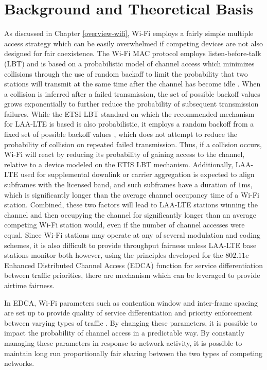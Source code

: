 \section{Background and Theoretical Basis}
\label{background}
As discussed in Chapter \ref{overview-wifi}, \mbox{Wi-Fi} employs a fairly simple multiple access strategy which can be easily overwhelmed if competing devices are not also designed for fair coexistence. The \mbox{Wi-Fi} MAC protocol employs listen-before-talk (LBT) and is based on a probabilistic model of channel access which minimizes collisions through the use of random backoff to limit the probability that two stations will transmit at the same time after the channel has become idle \cite{80211}.  When a collision is inferred after a failed transmission, the set of possible backoff values grows exponentially to further reduce the probability of subsequent transmission failures.  While the ETSI LBT standard on which the recommended mechanism for \mbox{LAA-LTE} is based is also probabilistic, it employs a random backoff from a fixed set of possible backoff values \cite{3gpp}, which does not attempt to reduce the probability of collision on repeated failed transmission.  Thus, if a collision occurs, \mbox{Wi-Fi} will react by reducing its probability of gaining access to the channel, relative to a device modeled on the ETIS LBT mechanism.  Additionally, \mbox{LAA-LTE} used for supplemental downlink or carrier aggregation is expected to align subframes with the licensed band, and such subframes have a duration of $1$ms, which is significantly longer than the average channel occupancy time of a Wi-Fi station.  Combined, these two factors will lead to \mbox{LAA-LTE} stations winning the channel and then occupying the channel for significantly longer than an average competing \mbox{Wi-Fi} station would, even if the number of channel accesses were equal.  Since \mbox{Wi-Fi} stations may operate at any of several modulation and coding schemes, it is also difficult to provide throughput fairness unless \mbox{LAA-LTE} base stations monitor both however, using the principles developed for the $802.11$e Enhanced Distributed Channel Access (EDCA) function for service differentiation between traffic priorities, there are mechanism which can be leveraged to provide airtime fairness.  

In EDCA, \mbox{Wi-Fi} parameters such as contention window and inter-frame spacing are set up to provide quality of service differentiation and priority enforcement between varying types of traffic \cite{80211}.  By changing these parameters, it is possible to impact the probability of channel access in a predictable way.  By constantly managing these parameters in response to network activity, it is possible to maintain long run proportionally fair sharing between the two types of competing networks.  

